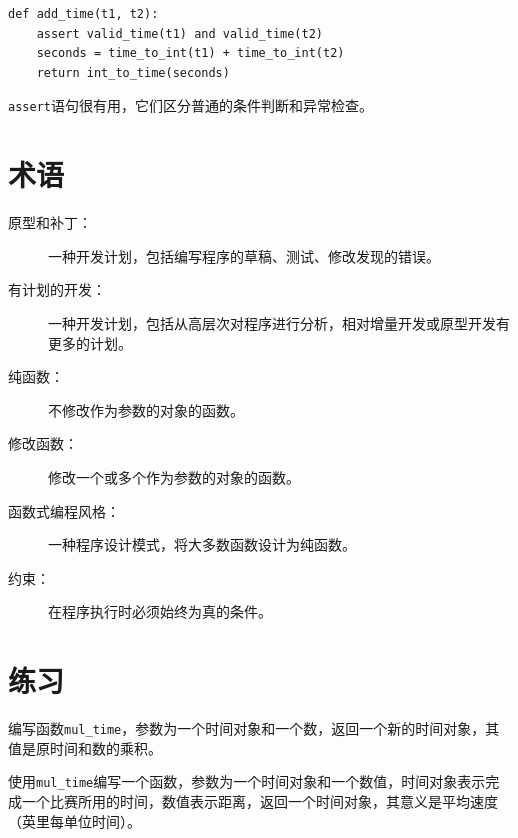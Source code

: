 
\beforeverb
\begin{verbatim}
def add_time(t1, t2):
    assert valid_time(t1) and valid_time(t2)
    seconds = time_to_int(t1) + time_to_int(t2)
    return int_to_time(seconds)
\end{verbatim}
\afterverb
%
{\tt assert}语句很有用，它们区分普通的条件判断和异常检查。


\section{术语}

\begin{description}

\item[原型和补丁：] 一种开发计划，包括编写程序的草稿、测试、修改发现的错误。

\item[有计划的开发：] 一种开发计划，包括从高层次对程序进行分析，相对增量开发或原型开发有更多的计划。

\item[纯函数：] 不修改作为参数的对象的函数。

\item[修改函数：] 修改一个或多个作为参数的对象的函数。

\item[函数式编程风格：] 一种程序设计模式，将大多数函数设计为纯函数。

\item[约束：] 在程序执行时必须始终为真的条件。

\end{description}


\section{练习}

\begin{ex}
编写函数\verb"mul_time"，参数为一个时间对象和一个数，返回一个新的时间对象，其值是原时间和数的乘积。

使用\verb"mul_time"编写一个函数，参数为一个时间对象和一个数值，时间对象表示完成一个比赛所用的时间，数值表示距离，返回一个时间对象，其意义是平均速度（英里每单位时间）。


\end{ex}

